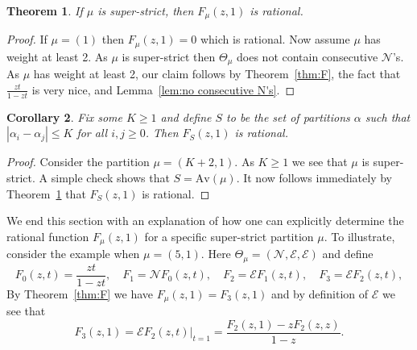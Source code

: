 \documentclass{article}
\theoremstyle{plain}
\newtheorem{theorem}{Theorem}[section]
\newtheorem{corollary}[theorem]{Corollary}
\theoremstyle{definition}
\newcommand{\Av}{\text{Av}}
\newcommand{\N}{\mathcal{N}}
\newcommand{\E}{\mathcal{E}}
\begin{document}



\begin{theorem}\label{thm:rational}
	If $\mu$ is super-strict, then $F_\mu(z,1)$ is rational.  
\end{theorem}

\begin{proof}
	If $\mu=(1)$ then $F_\mu(z,1) = 0$ which is rational.  Now assume $\mu$ has weight at least 2.  As $\mu$ is super-strict then $\Theta_\mu$ does not contain consecutive $\N$'s.  As $\mu$ has weight at least 2, our claim follows by Theorem~\ref{thm:F}, the fact that $\frac{zt}{1-zt}$ is very nice, and Lemma~\ref{lem:no consecutive N's}.  
\end{proof}

\begin{corollary}\label{cor:K}
	Fix some $K\geq 1$ and define $S$ to be the set of partitions $\alpha$ such that $|\alpha_i - \alpha_j| \leq K$ for all $i,j\geq 0$.  Then $F_S(z,1)$ is rational.
\end{corollary}
\begin{proof}
	Consider the partition $\mu = (K+2,1)$. As $K\geq 1$ we see that $\mu$ is super-strict.     A simple check shows that $S = \Av(\mu)$.   It now follows immediately by Theorem~\ref{thm:rational} that $F_S(z,1)$ is rational.  
\end{proof}


We end this section with an explanation of how one can explicitly determine the rational function $F_\mu(z,1)$ for a specific super-strict partition $\mu$.  To illustrate, consider the example when $\mu = (5,1)$.  Here $\Theta_\mu = (\N,\E,\E)$ and define
$$F_0(z,t) = \dfrac{zt}{1-zt},\quad F_1 = \N F_0(z,t), \quad F_2 = \E F_1(z,t), \quad F_3 = \E F_2(z,t),$$
By Theorem~\ref{thm:F} we have $F_\mu(z,1) = F_3(z,1)$ and by definition of $\E$ we see that 
$$F_3(z,1) = \left.\E F_2(z,t)\right|_{t=1} = \dfrac{F_2(z,1) - zF_2(z,z) }{1-z}.$$
\end{document}
